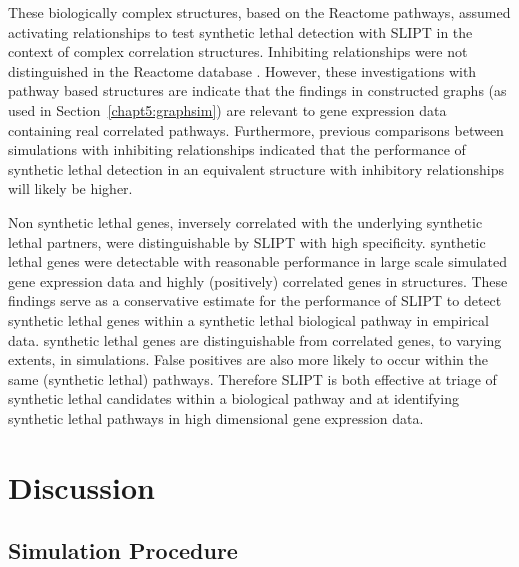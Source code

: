 These biologically complex  structures, based on the Reactome pathways, assumed activating relationships to test \gls{synthetic lethal} detection with \gls{SLIPT} in the context of complex correlation structures. Inhibiting relationships were not distinguished in the Reactome database \citep{Reactome}. However, these investigations with pathway based  structures are indicate that the findings in constructed \glspl{graph} (as used in Section~\ref{chapt5:graphsim}) are relevant to \gls{gene expression} data containing real correlated pathways. Furthermore, previous comparisons between simulations with inhibiting relationships indicated that the performance of \gls{synthetic lethal} detection in an equivalent  structure with inhibitory relationships will likely be higher.

Non synthetic lethal genes, inversely correlated with the underlying \gls{synthetic lethal} partners, were distinguishable by \gls{SLIPT} with high specificity. \Gls{synthetic lethal} genes were detectable with reasonable performance in large scale simulated \gls{gene expression} data and highly (positively) correlated genes in  structures. These findings serve as a conservative estimate for the performance of \gls{SLIPT} to detect \gls{synthetic lethal} genes within a \gls{synthetic lethal} biological pathway in empirical data. \Gls{synthetic lethal} genes are distinguishable from correlated genes, to varying extents, in simulations. False positives are also more likely to occur within the same (synthetic lethal) pathways. Therefore \gls{SLIPT} is both effective at triage of \gls{synthetic lethal} candidates within a biological pathway and at identifying \gls{synthetic lethal} pathways in high dimensional \gls{gene expression} data.


\FloatBarrier

\section{Discussion}

\subsection{Simulation Procedure}

